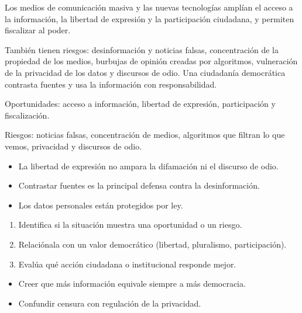\documentclass[10pt,a4paper,twocolumn]{article}
\begin{document}
Los medios de comunicación masiva y las nuevas tecnologías amplían el acceso a la información, la libertad de expresión y la participación ciudadana, y permiten fiscalizar al poder.

También tienen riesgos: desinformación y noticias falsas, concentración de la propiedad de los medios, burbujas de opinión creadas por algoritmos, vulneración de la privacidad de los datos y discursos de odio. Una ciudadanía democrática contrasta fuentes y usa la información con responsabilidad.

\begin{definicion}
Oportunidades: acceso a información, libertad de expresión, participación y fiscalización.

Riesgos: noticias falsas, concentración de medios, algoritmos que filtran lo que vemos, privacidad y discursos de odio.
\end{definicion}

\begin{ideasclave}
\begin{itemize}
  \item La libertad de expresión no ampara la difamación ni el discurso de odio.
  \item Contrastar fuentes es la principal defensa contra la desinformación.
  \item Los datos personales están protegidos por ley.
\end{itemize}
\end{ideasclave}

\begin{metodo}
\begin{enumerate}
  \item Identifica si la situación muestra una oportunidad o un riesgo.
  \item Relaciónala con un valor democrático (libertad, pluralismo, participación).
  \item Evalúa qué acción ciudadana o institucional responde mejor.
\end{enumerate}
\end{metodo}

\begin{errorfrecuente}
\begin{itemize}
  \item Creer que más información equivale siempre a más democracia.
  \item Confundir censura con regulación de la privacidad.
\end{itemize}
\end{errorfrecuente}
\end{document}

